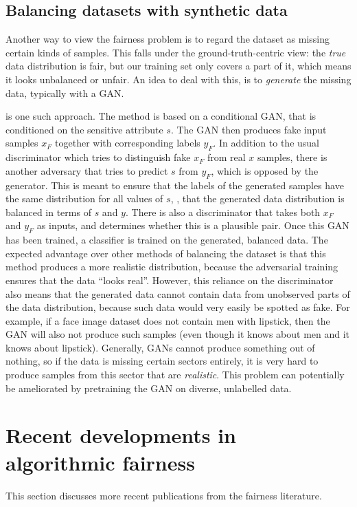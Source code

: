 \subsection{Balancing datasets with synthetic data}
Another way to view the fairness problem is to regard the dataset as missing certain kinds of samples.
This falls under the ground-truth-centric view:
the \emph{true} data distribution is fair, but our training set only covers a part of it,
which means it looks unbalanced or unfair.
An idea to deal with this, is to \emph{generate} the missing data,
typically with a \ac{GAN}.

\citet{sattigeri2019fairness} is one such approach.
The method is based on a conditional \ac{GAN},
that is conditioned on the sensitive attribute \(s\).
The \ac{GAN} then produces fake input samples \(x_F\) together with corresponding labels \(y_F\).
In addition to the usual discriminator which tries to distinguish fake \(x_F\) from real \(x\) samples,
there is another adversary that tries to predict \(s\) from \(y_F\),
which is opposed by the generator.
This is meant to ensure that the labels of the generated samples
have the same distribution for all values of \(s\),
\ie, that the generated data distribution is balanced in terms of \(s\) and \(y\).
There is also a discriminator that takes both \(x_F\) and \(y_F\) as inputs,
and determines whether this is a plausible pair.
Once this \ac{GAN} has been trained,
a classifier is trained on the generated, balanced data.
The expected advantage over other methods of balancing the dataset is
that this method produces a more realistic distribution,
because the adversarial training ensures that the data ``looks real''.
However, this reliance on the discriminator also means
that the generated data cannot contain data from unobserved parts of the data distribution,
because such data would very easily be spotted as fake.
For example, if a face image dataset does not contain men with lipstick,
then the \ac{GAN} will also not produce such samples
(even though it knows about men and it knows about lipstick).
Generally, \acp{GAN} cannot produce something out of nothing,
so if the data is missing certain sectors entirely,
it is very hard to produce samples from this sector that are \emph{realistic}.
This problem can potentially be ameliorated by pretraining the \ac{GAN}
on diverse, unlabelled data.

\section{Recent developments in algorithmic fairness}%
\label{sec:refinement-on-previous-ideas-for-fair-classification-and-fair-representations}
This section discusses more recent publications from the fairness literature.

